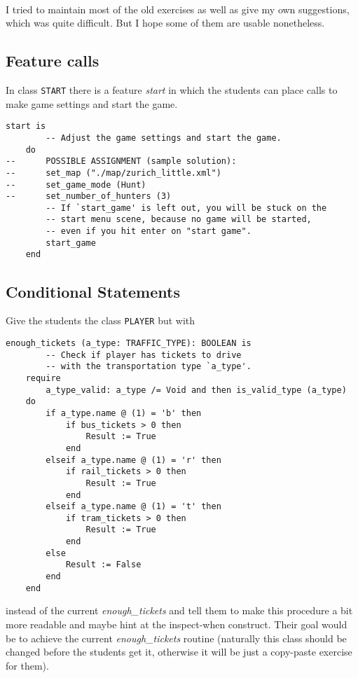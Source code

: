 \paragraph{}
I tried to maintain most of the old exercises as well as give my own suggestions, which was quite difficult. But I hope some of them are usable nonetheless.

\subsection{Feature calls}
In class \texttt{START} there is a feature \textit{start} in which the students can place calls to make game settings and start the game.

\begin{lstlisting}
start is
		-- Adjust the game settings and start the game.
	do
--		POSSIBLE ASSIGNMENT (sample solution):
--		set_map ("./map/zurich_little.xml")
--		set_game_mode (Hunt)
--		set_number_of_hunters (3)
		-- If `start_game' is left out, you will be stuck on the 
		-- start menu scene, because no game will be started, 
		-- even if you hit enter on "start game".
		start_game
	end
\end{lstlisting}

\subsection{Conditional Statements}
Give the students the class \texttt{PLAYER} but with

\begin{lstlisting}
enough_tickets (a_type: TRAFFIC_TYPE): BOOLEAN is
		-- Check if player has tickets to drive 
		-- with the transportation type `a_type'.
	require 
		a_type_valid: a_type /= Void and then is_valid_type (a_type)
	do
		if a_type.name @ (1) = 'b' then
			if bus_tickets > 0 then
				Result := True
			end
		elseif a_type.name @ (1) = 'r' then
			if rail_tickets > 0 then
				Result := True
			end	
		elseif a_type.name @ (1) = 't' then
			if tram_tickets > 0 then
				Result := True
			end		
		else
			Result := False
		end
	end
\end{lstlisting}
instead of the current \textit{enough\_tickets} and tell them to make this procedure a bit more readable and maybe hint at the inspect-when construct. Their goal would be to achieve the current \textit{enough\_tickets} routine (naturally this class should be changed before the students get it, otherwise it will be just a copy-paste exercise for them).

